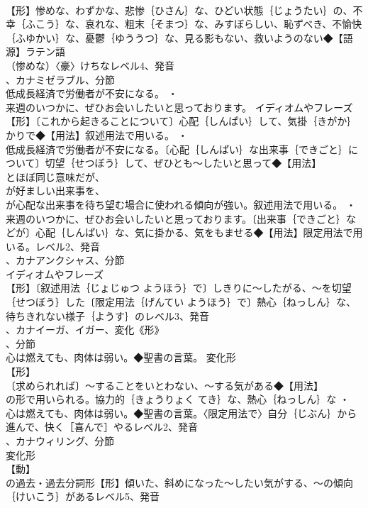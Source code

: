 \documentclass[8pt]{extreport}
\begin{document}
\begin{CJK}{UTF8}{min}
\\	【形】惨めな、わずかな、悲惨｛ひさん｝な、ひどい状態｛じょうたい｝の、不幸｛ふこう｝な、哀れな、粗末｛そまつ｝な、みすぼらしい、恥ずべき、不愉快｛ふゆかい｝な、憂鬱｛ゆううつ｝な、見る影もない、救いようのない◆【語源】ラテン語
\\	（惨めな）〈豪〉けちなレベル4、発音
\\	、カナミゼラブル、分節
\\	低成長経済で労働者が不安になる。 ・
\\	来週のいつかに、ぜひお会いしたいと思っております。	イディオムやフレーズ 
\\	【形】〔これから起きることについて〕心配｛しんぱい｝して、気掛｛きがか｝かりで◆【用法】叙述用法で用いる。 ・
\\	低成長経済で労働者が不安になる。〔心配｛しんぱい｝な出来事｛できごと｝について〕切望｛せつぼう｝して、ぜひとも～したいと思って◆【用法】
\\	とほぼ同じ意味だが、
\\	が好ましい出来事を、
\\	が心配な出来事を待ち望む場合に使われる傾向が強い。叙述用法で用いる。 ・
\\	来週のいつかに、ぜひお会いしたいと思っております。〔出来事｛できごと｝などが〕心配｛しんぱい｝な、気に掛かる、気をもませる◆【用法】限定用法で用いる。レベル2、発音
\\	、カナアンクシャス、分節
\\	イディオムやフレーズ 
\\	【形】〔叙述用法｛じょじゅつ ようほう｝で〕しきりに～したがる、～を切望｛せつぼう｝した〔限定用法｛げんてい ようほう｝で〕熱心｛ねっしん｝な、待ちきれない様子｛ようす｝のレベル3、発音
\\	、カナイーガ、イガー、変化《形》
\\	、分節
\\	心は燃えても、肉体は弱い。◆聖書の言葉。	変化形 
\\	【形】
\\	〔求められれば〕～することをいとわない、～する気がある◆【用法】
\\	の形で用いられる。協力的｛きょうりょく てき｝な、熱心｛ねっしん｝な ・
\\	心は燃えても、肉体は弱い。◆聖書の言葉。〈限定用法で〉自分｛じぶん｝から進んで、快く［喜んで］やるレベル2、発音
\\	、カナウィリング、分節
\\	変化形 
\\	【動】
\\	の過去・過去分詞形【形】傾いた、斜めになった～したい気がする、～の傾向｛けいこう｝があるレベル5、発音

\end{CJK}
\end{document}
